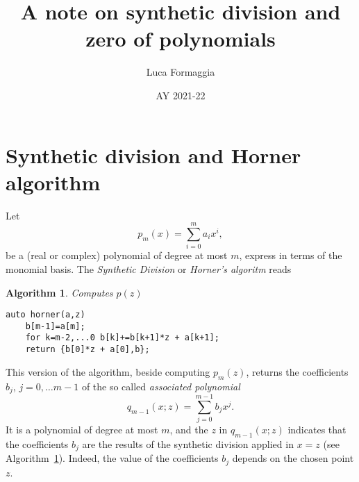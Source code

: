 \documentclass[10pt,a4paper]{article}
\author{Luca Formaggia}
\date{AY 2021-22}
\title{A note on synthetic division and zero of polynomials}
\theoremstyle{definition}%
\newtheorem{algo}{Algorithm}
\begin{document}
 
 \maketitle
 \section{Synthetic division and Horner algorithm}
 Let
 \[
 p_m(x)=\sum_{i=0}^{m} a_i x^i,
 \]
be a (real or complex) polynomial of degree at most $m$, express in terms of the monomial basis. The \emph{Synthetic Division} or \emph{Horner's algoritm} reads

\begin{algo}\label{alg:horner}
\emph{Computes $p(z)$}
\begin{lstlisting}
auto horner(a,z)
    b[m-1]=a[m];
    for k=m-2,...0 b[k]+=b[k+1]*z + a[k+1]; 
    return {b[0]*z + a[0],b}; 
\end{lstlisting}
\end{algo}
This version of the algorithm, beside computing $p_m(z)$, returns the coefficients $b_j$, $j=0,\ldots m-1$ of the so called \emph{associated polynomial}
\begin{equation}
\label{eq:associated}
q_{m-1}(x;z)=\sum_{j=0}^{m-1}b_j x^j.
\end{equation}
It is a polynomial of degree at most $m$, and the $z$ in $q_{m-1}(x;z)$ indicates that the coefficients $b_j$ are the results of the synthetic division applied in $x=z$ (see Algorithm~\ref{alg:horner}). Indeed, the value of the coefficients $b_j$ depends on the chosen point $z$. 
\end{document}
